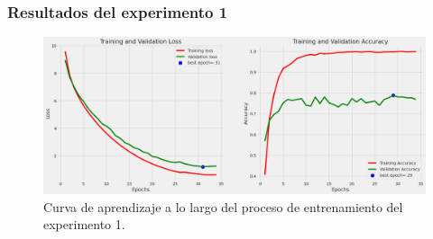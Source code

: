 \documentclass{beamer}
\begin{document}
\begin{frame}
  \frametitle{Resultados del experimento 1}

  \begin{figure}[H]
    \begin{center}
        \includegraphics[width=1\textwidth]{./Graphics/training&validation_p1.png}
        \caption{Curva de aprendizaje a lo largo del proceso de entrenamiento del experimento 1.}
    \end{center}
\end{figure}
\end{frame}
\end{document}
